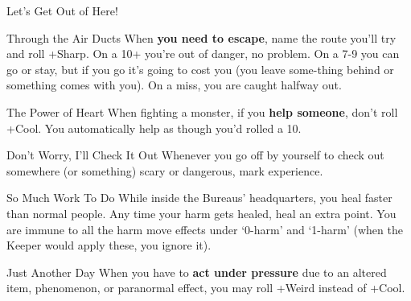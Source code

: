 {\begin{move}{Let's Get Out of Here!}
\end{move}%
\br[1mm]
%
\begin{move}{Through the Air Ducts}
When \textbf{you need to escape}, name the route you’ll try and roll +Sharp. On a 10+ you’re out of danger, no problem. On a 7-9 you can go or stay, but if you go it’s going to cost you (you leave some-thing behind or something comes with you). On a miss, you are caught halfway out.
\end{move}%
\br[1mm]
%
\begin{move}{The Power of Heart}
When fighting a monster, if you \textbf{help someone}, don’t roll +Cool. You automatically help as though you’d rolled a 10.
\end{move}%
\br[1mm]
%
\begin{move}{Don't Worry, I'll Check It Out}
Whenever you go off by yourself to check out somewhere (or something) scary or dangerous, mark experience.
\end{move}%
\br[1mm]
%
\begin{move}{So Much Work To Do}
While inside the Bureaus' headquarters, you heal faster than normal people. Any time your harm gets healed, heal an extra point. You are immune to all the harm move effects under ‘0-harm’ and ‘1-harm’ (when the Keeper would apply these, you ignore it).
\end{move}%
\br[1mm]
%
\begin{move}{Just Another Day}
When you have to \textbf{act under pressure} due to an altered item, phenomenon, or paranormal effect, you may roll +Weird instead of +Cool.
\end{move}%
\br[1mm]
%
}\pagebreak%
%
